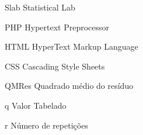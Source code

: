 \begin{siglas}
	\item[Slab] Statistical Lab
	\item[PHP] Hypertext Preprocessor
	\item[HTML] HyperText Markup Language
	\item[CSS] Cascading Style Sheets
	\item[QMRes] Quadrado médio do resíduo
	\item[q] Valor Tabelado
	\item[r] Número de repetições
\end{siglas}
